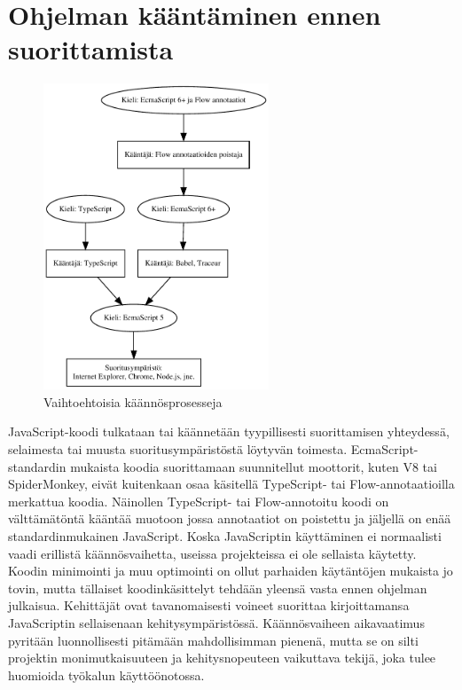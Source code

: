 \section{Ohjelman kääntäminen ennen suorittamista}
\begin{figure}[!htb]
\centering
\includegraphics[width=0.6\textwidth]{images/compilation.pdf}
\caption{Vaihtoehtoisia käännösprosesseja}
\label{fig:compilation}
\end{figure}
JavaScript-koodi tulkataan tai käännetään tyypillisesti suorittamisen
yhteydessä, selaimesta tai muusta suoritusympäristöstä löytyvän 
toimesta. EcmaScript-stan\-dar\-din mukaista koodia suorittamaan suunnitellut
moottorit, kuten V8 tai SpiderMonkey, eivät kuitenkaan osaa käsitellä
TypeScript- tai Flow-annotaatioilla merkattua koodia. Näinollen TypeScript-
tai Flow-annotoitu koodi on välttämätöntä kääntää muotoon jossa
annotaatiot on poistettu ja jäljellä on enää standardinmukainen JavaScript.
Koska JavaScriptin käyttäminen ei normaalisti vaadi erillistä
käännösvaihetta, useissa projekteissa ei ole sellaista käytetty. Koodin
minimointi ja muu optimointi on ollut parhaiden käytäntöjen mukaista jo
tovin, mutta tällaiset koodinkäsittelyt tehdään yleensä vasta ennen ohjelman
julkaisua. Kehittäjät ovat tavanomaisesti voineet suorittaa kirjoittamansa
JavaScriptin sellaisenaan kehitysympäristössä. Käännösvaiheen aikavaatimus
pyritään luonnollisesti pitämään mahdollisimman pienenä, mutta se on silti
projektin monimutkaisuuteen ja kehitysnopeuteen vaikuttava tekijä, joka
tulee huomioida työkalun käyttöönotossa.

